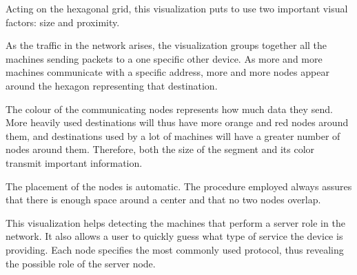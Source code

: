 Acting on the hexagonal grid, this visualization puts to use two important visual factors:
size and proximity.

As the traffic in the network arises, the visualization groups together all the machines
sending packets to a one specific other device. As more and more machines communicate with a specific
address, more and more nodes appear around the hexagon representing that destination.

The colour of the communicating nodes represents how much data they send. More heavily used destinations 
will thus have more orange and red nodes around them, and destinations used by a lot of machines will have a greater number of nodes around them. Therefore, both the size of the segment and its color transmit important information.

The placement of the nodes is automatic. The procedure employed always assures that there is enough space around a center
and that no two nodes overlap.

This visualization helps detecting the machines that perform a server role in the network.
It also allows a user to quickly guess what type of service the device is providing. Each node specifies the
most commonly used protocol, thus revealing the possible role of the server node.